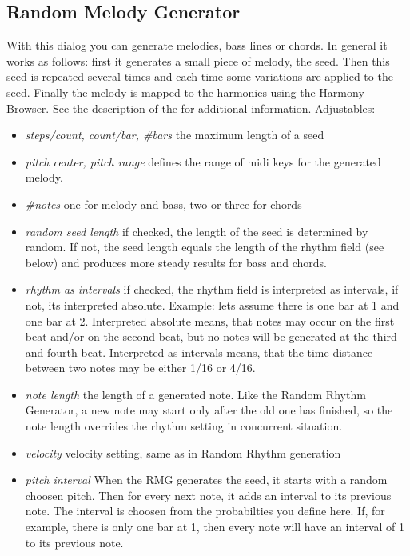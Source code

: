 \documentclass[letterpaper]{report}
\begin{document}
\subsection{Random Melody Generator}\label{shuffle}

With this dialog you can generate melodies, bass lines or chords.
In general it works as follows: first it generates a small piece of melody,
the seed. Then this seed is repeated several times and each time some variations are
applied to the seed. Finally the melody is mapped to the harmonies using the Harmony
Browser. See the description of the 
for additional information. Adjustables:

\begin{itemize}

\item {\em steps/count, count/bar, \#bars} the maximum length of a seed

\item{\em pitch center, pitch range} defines the range of midi keys for the
generated melody.

\item{\em \#notes} one for melody and bass, two or three for chords

\item{\em random seed length} if checked, the length of the seed is
determined by random. If not, the seed length equals the length of
the rhythm field (see below) and produces more steady results for bass
and chords.

\item{\em rhythm as intervals} if checked, the rhythm field is interpreted as
intervals, if not, its interpreted absolute. Example: lets assume there is one bar
at 1 and one bar at 2. Interpreted absolute means, that notes may occur on the first
beat and/or on the second beat, but no notes will be generated at the third and fourth
beat. Interpreted as intervals means, that the time distance between two notes
may be either 1/16 or 4/16.

\item{\em note length} the length of a generated note. Like the Random Rhythm
Generator, a new note may start only after the old one has finished, so the
note length overrides the rhythm setting in concurrent situation.

\item{\em velocity} velocity setting, same as in Random Rhythm generation

\item{\em pitch interval} When the RMG generates the seed, it starts with a random
choosen pitch. Then for every next note, it adds an interval to its previous note.
The interval is choosen from the probabilties you define here. If, for example, there
is only one bar at 1, then every note will have an interval of 1 to its previous
note.


\end{itemize}
\end{document}

